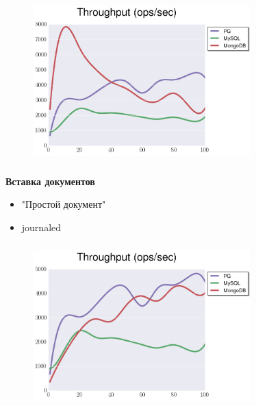 \documentclass[usenames,dvipsnames, 18pt, compress, aspectratio=169]{beamer}
\begin{document}
\begin{frame}
    \frametitle{}
    \begin{center}
    \begin{figure}
        \includegraphics[width=0.75\textwidth,center]{benchmarks/insert_throughput.png}
    \end{figure}
    \end{center}
\end{frame}

\begin{frame}
    \frametitle{}
    \begin{center}
        \textbf{Вставка документов}
        \begin{itemize}[label={}]
            \item "Простой документ"
            \item journaled
        \end{itemize}
    \end{center}
\end{frame}

\begin{frame}
    \frametitle{}
    \begin{center}
    \begin{figure}
        \includegraphics[width=0.75\textwidth,center]{benchmarks/insert_throughput_journaled.png}
    \end{figure}
    \end{center}
\end{frame}
\end{document}
